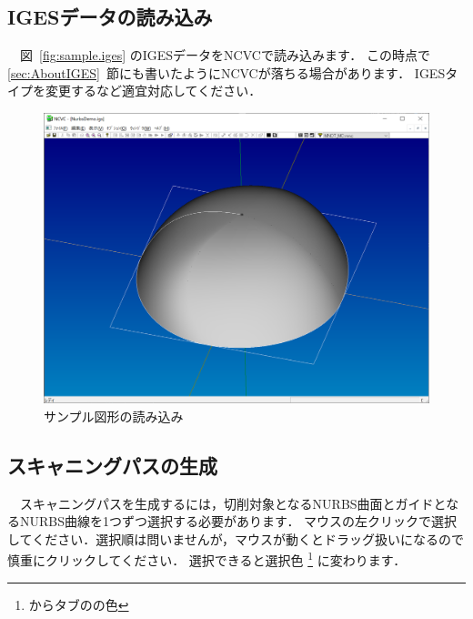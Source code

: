 
\subsection{IGESデータの読み込み}
　図~\ref{fig:sample.iges} のIGESデータをNCVCで読み込みます．
この時点で \ref{sec:AboutIGES}~節にも書いたようにNCVCが落ちる場合があります．
IGESタイプを変更するなど適宜対応してください．

\begin{figure}[H]
\centering
\includegraphics[scale=0.5]{No2/fig/fig21.png}
\caption{サンプル図形の読み込み}
\label{fig:ncvc21}
\end{figure}

\subsection{スキャニングパスの生成}
　スキャニングパスを生成するには，切削対象となるNURBS曲面とガイドとなるNURBS曲線を1つずつ選択する必要があります．
マウスの左クリックで選択してください．選択順は問いませんが，マウスが動くとドラッグ扱いになるので慎重にクリックしてください．
選択できると選択色
\footnote{からタブのの色}
に変わります．

